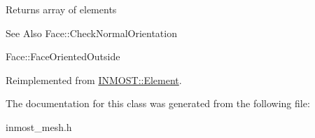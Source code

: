 \begin{DoxyReturn}{Returns}
array of elements 
\end{DoxyReturn}
\begin{DoxySeeAlso}{See Also}
Face\-::\-Check\-Normal\-Orientation 

Face\-::\-Face\-Oriented\-Outside 
\end{DoxySeeAlso}


Reimplemented from \hyperlink{classINMOST_1_1Element_a00696ff8cd77491e1c4307cae166e92d}{I\-N\-M\-O\-S\-T\-::\-Element}.



The documentation for this class was generated from the following file\-:\begin{DoxyCompactItemize}
\item 
inmost\-\_\-mesh.\-h\end{DoxyCompactItemize}
